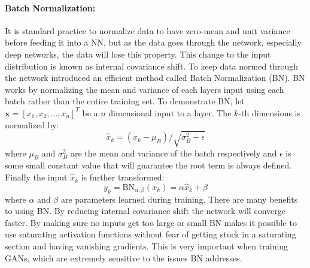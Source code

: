 \paragraph{Batch Normalization:}
It is standard practice to normalize data to have zero-mean and unit variance before feeding it into a NN, but as the data goes through the network, especially deep networks, the data will lose this property. This change to the input distribution is known as internal covariance shift. To keep data normed through the network \cite{ioffe2015batch} introduced an efficient method called Batch Normalization (BN). BN works by normalizing the mean and variance of each layers input using each batch rather than the entire training set. To demonstrate BN, let $\textbf{x} = [x_1,x_2,...,x_n]^T$ be a $n$ dimensional input to a layer. The $k$-th dimensions is normalized by:
\begin{equation}
\hat{x}_k = (x_k - \mu_{B})/\sqrt{\sigma^2_B + \epsilon}
\label{eq:BN1}
\end{equation}
where $\mu_{B}$ and $\sigma^2_B$ are the mean and variance of the batch respectively and $\epsilon$ is some small constant value that will guarantee the root term is always defined. Finally the input $\hat{x}_k$ is further transformed:
\begin{equation}
y_k = \mbox{BN}_{\alpha,\beta}(x_k) = \alpha \hat{x}_k + \beta
\label{eq:BN2}
\end{equation}
where $\alpha$ and $\beta$ are parameters learned during training. There are many benefits to using BN. By reducing internal covariance shift the network will converge faster. By making sure no inputs get too large or small BN makes it possible to use saturating activation functions without fear of getting stuck in a saturating section and having vanishing gradients. This is very important when training GANs, which are extremely sensitive to the issues BN addresses.


